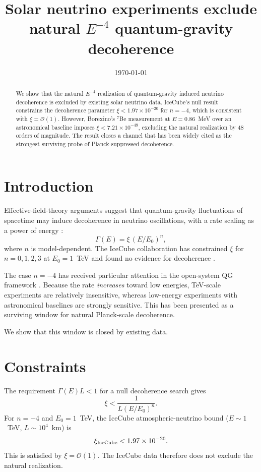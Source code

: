 \documentclass[twocolumn,prd,superscriptaddress,nofootinbib]{revtex4-2}
\begin{document}
\title{Solar neutrino experiments exclude natural $E^{-4}$
quantum-gravity decoherence}

\author{}
\affiliation{}

\date{\today}

\begin{abstract}
We show that the natural $E^{-4}$ realization of quantum-gravity
induced neutrino decoherence is excluded by existing solar neutrino
data. IceCube's null result constrains the decoherence parameter
$\xi < 1.97 \times 10^{-20}$ for $n = -4$, which is consistent with
$\xi = \mathcal{O}(1)$. However, Borexino's $^7$Be measurement at
$E = 0.86$~MeV over an astronomical baseline imposes
$\xi < 7.21 \times 10^{-49}$, excluding the natural realization by
48 orders of magnitude. The result closes a channel that has been
widely cited as the strongest surviving probe of
Planck-suppressed decoherence.
\end{abstract}

\section{Introduction}

Effective-field-theory arguments suggest that quantum-gravity
fluctuations of spacetime may induce decoherence in neutrino
oscillations, with a rate scaling as a power of energy
\cite{Stodolsky1984,EllisHagelinNanopoulos1992,Lisi2000}:
\begin{equation}
\Gamma(E) = \xi \, (E/E_0)^n,
\end{equation}
where $n$ is model-dependent. The IceCube collaboration has
constrained $\xi$ for $n = 0, 1, 2, 3$ at $E_0 = 1$~TeV and
found no evidence for decoherence \cite{IceCube2024}.

The case $n = -4$ has received particular attention in the
open-system QG framework \cite{OpenSystem2019}. Because the rate
\emph{increases} toward low energies, TeV-scale experiments are
relatively insensitive, whereas low-energy experiments with
astronomical baselines are strongly sensitive. This has been
presented as a surviving window for natural Planck-scale
decoherence.

We show that this window is closed by existing data.

\section{Constraints}

The requirement $\Gamma(E) L < 1$ for a null decoherence search
gives
\begin{equation}
\xi < \frac{1}{L (E/E_0)^n}.
\end{equation}
For $n = -4$ and $E_0 = 1$~TeV, the IceCube atmospheric-neutrino
bound ($E \sim 1$~TeV, $L \sim 10^4$~km) is
\begin{equation}
\xi_{\rm IceCube} < 1.97 \times 10^{-20}.
\end{equation}
This is satisfied by $\xi = \mathcal{O}(1)$. The IceCube data
therefore does not exclude the natural realization.
\end{document}
